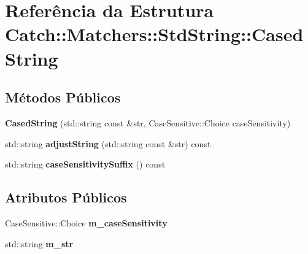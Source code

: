 \hypertarget{structCatch_1_1Matchers_1_1StdString_1_1CasedString}{}\section{Referência da Estrutura Catch\+:\+:Matchers\+:\+:Std\+String\+:\+:Cased\+String}
\label{structCatch_1_1Matchers_1_1StdString_1_1CasedString}
\subsection*{Métodos Públicos}
\begin{DoxyCompactItemize}
\item 
{\bfseries Cased\+String} (std\+::string const \&str, Case\+Sensitive\+::\+Choice case\+Sensitivity)\hypertarget{structCatch_1_1Matchers_1_1StdString_1_1CasedString_aa88bbc5acd2bff22351d8d4b1816b561}{}\label{structCatch_1_1Matchers_1_1StdString_1_1CasedString_aa88bbc5acd2bff22351d8d4b1816b561}

\item 
std\+::string {\bfseries adjust\+String} (std\+::string const \&str) const \hypertarget{structCatch_1_1Matchers_1_1StdString_1_1CasedString_a0ff84e194426c8f4bca0660b9180d20d}{}\label{structCatch_1_1Matchers_1_1StdString_1_1CasedString_a0ff84e194426c8f4bca0660b9180d20d}

\item 
std\+::string {\bfseries case\+Sensitivity\+Suffix} () const \hypertarget{structCatch_1_1Matchers_1_1StdString_1_1CasedString_a1113c80dd02967032a99290bdcd1b590}{}\label{structCatch_1_1Matchers_1_1StdString_1_1CasedString_a1113c80dd02967032a99290bdcd1b590}

\end{DoxyCompactItemize}
\subsection*{Atributos Públicos}
\begin{DoxyCompactItemize}
\item 
Case\+Sensitive\+::\+Choice {\bfseries m\+\_\+case\+Sensitivity}\hypertarget{structCatch_1_1Matchers_1_1StdString_1_1CasedString_ae1c2864c986941536a6e94cca0528f92}{}\label{structCatch_1_1Matchers_1_1StdString_1_1CasedString_ae1c2864c986941536a6e94cca0528f92}

\item 
std\+::string {\bfseries m\+\_\+str}\hypertarget{structCatch_1_1Matchers_1_1StdString_1_1CasedString_ad05dbc99aba3c3c386d6b856b213f911}{}\label{structCatch_1_1Matchers_1_1StdString_1_1CasedString_ad05dbc99aba3c3c386d6b856b213f911}

\end{DoxyCompactItemize}


